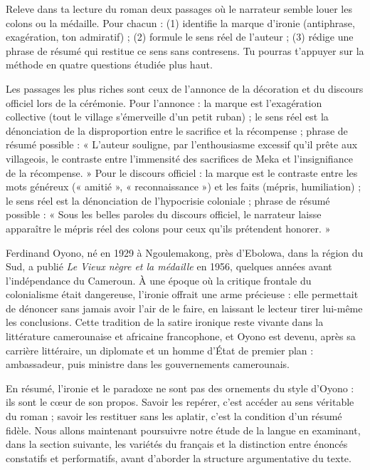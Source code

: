 \documentclass[11pt]{article}
\begin{document}
\begin{exercice}
Releve dans ta lecture du roman deux passages où le narrateur semble louer les colons ou la médaille. Pour chacun : (1) identifie la marque d'ironie (antiphrase, exagération, ton admiratif) ; (2) formule le sens réel de l'auteur ; (3) rédige une phrase de résumé qui restitue ce sens sans contresens. Tu pourras t'appuyer sur la méthode en quatre questions étudiée plus haut.
\end{exercice}

\begin{corrige}
Les passages les plus riches sont ceux de l'annonce de la décoration et du discours officiel lors de la cérémonie. Pour l'annonce : la marque est l'exagération collective (tout le village s'émerveille d'un petit ruban) ; le sens réel est la dénonciation de la disproportion entre le sacrifice et la récompense ; phrase de résumé possible : « L'auteur souligne, par l'enthousiasme excessif qu'il prête aux villageois, le contraste entre l'immensité des sacrifices de Meka et l'insignifiance de la récompense. » Pour le discours officiel : la marque est le contraste entre les mots généreux (« amitié », « reconnaissance ») et les faits (mépris, humiliation) ; le sens réel est la dénonciation de l'hypocrisie coloniale ; phrase de résumé possible : « Sous les belles paroles du discours officiel, le narrateur laisse apparaître le mépris réel des colons pour ceux qu'ils prétendent honorer. »
\end{corrige}

\begin{savaistu}
Ferdinand Oyono, né en 1929 à Ngoulemakong, près d'Ebolowa, dans la région du Sud, a publié \emph{Le Vieux nègre et la médaille} en 1956, quelques années avant l'indépendance du Cameroun. À une époque où la critique frontale du colonialisme était dangereuse, l'ironie offrait une arme précieuse : elle permettait de dénoncer sans jamais avoir l'air de le faire, en laissant le lecteur tirer lui-même les conclusions. Cette tradition de la satire ironique reste vivante dans la littérature camerounaise et africaine francophone, et Oyono est devenu, après sa carrière littéraire, un diplomate et un homme d'État de premier plan : ambassadeur, puis ministre dans les gouvernements camerounais.
\end{savaistu}

En résumé, l'ironie et le paradoxe ne sont pas des ornements du style d'Oyono : ils sont le cœur de son propos. Savoir les repérer, c'est accéder au sens véritable du roman ; savoir les restituer sans les aplatir, c'est la condition d'un résumé fidèle. Nous allons maintenant poursuivre notre étude de la langue en examinant, dans la section suivante, les variétés du français et la distinction entre énoncés constatifs et performatifs, avant d'aborder la structure argumentative du texte.
\end{document}
